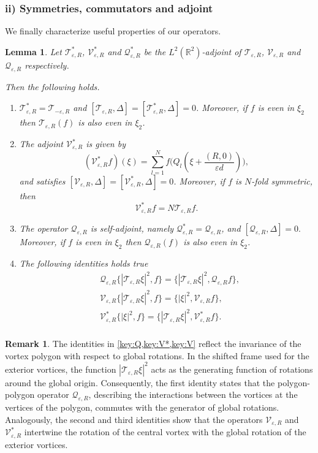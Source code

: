 \documentclass[11pt,reqno,a4paper]{amsart}
\def\eps{\varepsilon}
\def\RR {\mathbb{R}}
\newcommand{\cQ}{\mathcal{Q}}
\newcommand{\cT}{\mathcal{T}}
\newcommand{\cV}{\mathcal{V}}
\newcommand{\1}{\mathbbm{1}}
\newtheorem{lemma}[proposition]{Lemma}
\theoremstyle{definition}
\newtheorem{remark}[proposition]{Remark}
\theoremstyle{definition}
\numberwithin{equation}{section}
\begin{document}
\subsubsection*{{\rm ii)} \textbf{
Symmetries, commutators and adjoint}}
We finally characterize useful properties of our operators. \begin{lemma}\label{lem:adjoints}
    Let  $\cT_{\eps,R}^*$, $\cV_{\eps,R}^*$ and $\cQ_{\eps,R}^*$ be the $L^2(\RR^2)$-adjoint  of $\cT_{\eps,R}$, $\cV_{\eps,R}$ and $\cQ_{\eps,R}$ respectively.

Then the following holds.
\begin{enumerate}
    \item $\cT_{\eps,R}^*=\cT_{-{\eps,R}}$ and $[\cT_{\eps,R},\Delta]=[\cT^*_{\eps,R},\Delta]=0$. Moreover, if $f$ is even in $\xi_2$ then $\cT_{\eps,R}(f)$ is also even in $\xi_2$.
    \item The adjoint $\cV_{\eps,R}^*$ is given by
        \begin{equation}
            \label{def:Veps*}
            (\cV_{\eps,R}^*f)(\xi)=\sum_{l=1}^Nf\big(Q_l(\xi+\frac{(R,0)}{\eps d})\big), 
        \end{equation}
        and satisfies $[\cV_{\eps,R},\Delta]=[\cV_{\eps,R}^*,\Delta]=0$.
        Moreover, if $f$ is $N$-fold symmetric, then $$\cV_{\eps,R}^* f=N\cT_{\eps,R} f.$$
    \item The operator $\cQ_{\eps,R}$ is self-adjoint, namely $\cQ_{\eps,R}^*=\cQ_{\eps,R}$, and $[\cQ_{\eps,R},\Delta]=0.$ Moreover, if $f$ is even in $\xi_2$ then $\cQ_{\eps,R}(f)$ is also even in $\xi_2$.
    \item The following identities holds true
    \begin{align}
    \label{key:Q}
        &\cQ_{\eps,R}\{|\cT_{\eps,R}\xi|^2,f\}=\{|\cT_{\eps,R}\xi|^2,\cQ_{\eps,R}f\},\\
                \label{key:V}&\cV_{\eps,R}\{|\cT_{\eps,R}\xi|^2,f\}=\{|\xi|^2,\cV_{\eps,R}f\},\\
        \label{key:V*}&\cV^*_{\eps,R}\{|\xi|^2,f\}=\{|\cT_{\eps,R}\xi|^2,\cV^*_{\eps,R}f\}.\\
    \end{align}
\end{enumerate}
\end{lemma}
\begin{remark}
The identities in \cref{key:Q,key:V*,key:V} reflect the invariance of the vortex polygon with respect to global rotations. In the shifted frame used for the exterior vortices, the function $|\cT_{\eps,R}\xi|^2$ acts as the generating function of rotations around the global origin. Consequently, the first identity states that the polygon-polygon operator $\cQ_{\eps,R}$, describing the interactions between the vortices at the vertices of the polygon, commutes with the generator of global rotations. Analogously, the second and third identities show that the operators $\cV_{\eps,R}$ and $\cV_{\eps,R}^*$ intertwine the rotation of the central vortex with the global rotation of the exterior vortices.
\end{remark}
\end{document}
